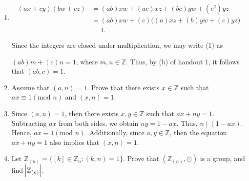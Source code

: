 \documentclass[12pt]{article}
\makeatletter
\theoremstyle{definition}
\theoremstyle{remark}
\renewenvironment{proof}[1][\proofname]{\par
  \pushQED{\qed}%
  \normalfont \topsep6\p@\@plus6\p@\relax
  \list{}{\leftmargin=0mm
          \rightmargin=4mm
          \settowidth{\itemindent}{\itshape#1}%
          \labelwidth=\itemindent
          \parsep=0pt \listparindent=\parindent 
  }
  \item[\hskip\labelsep
        \itshape
    #1\@addpunct{.}]\ignorespaces
}{%
  \popQED\endlist\@endpefalse
}
\let\oldproofname=\proofname
\renewcommand{\proofname}{\bf{\textit{\oldproofname}}}
\makeatother
\begin{document}
\begin{enumerate}[leftmargin=*]
\begin{enumerate}[label=(\alph*)]
\begin{proof}
                \begin{equation}
                    \begin{split}
                        (ax+cy)(bw+cz) &= (ab)xw+(ac)xz+(bc)yw+(c^2)yz \\
                                       &= (ab)xw+(c)\big((a)xz+(b)yw+(c)yz\big) \\
                                       &= 1.
                    \end{split}
                \end{equation}
                
                Since the integers are closed under multiplication, we may write (1) as\par $(ab)m+(c)n=1$, where $m,n\in\mathbb{Z}$. Thus, by (b) of handout 1, it follows that $(ab,c)=1$.
            \end{proof}
            
            \item Assume that $(a,n)=1$. Prove that there exists $x\in\mathbb{Z}$ such that $ax\equiv 1(\text{mod }n)$ and $(x,n)=1$.
            
            \begin{proof}
                Since $(a,n)=1$, then there exists $x,y\in\mathbb{Z}$ such that $ax+ny=1$. Subtracting $ax$ from both sides, we obtain $ny=1-ax$. Thus, $n\mid (1-ax)$. Hence, $ax\equiv1(\text{mod }n)$. Additionally, since $a,y\in\mathbb{Z}$, then the equation $ax+ny=1$ also implies that $(x,n)=1$. 
            \end{proof}
            
            \newpage
            
            \item Let $\mathbb{Z}_{(n)}=\{[k]\in\mathbb{Z}_{n}\colon (k,n)=1\}$. Prove that $(\mathbb{Z}_{(n)},\odot)$ is a group, and find $\abs{\mathbb{Z}_{(n)}}$.
            

\end{enumerate}
\end{enumerate}
\end{document}
